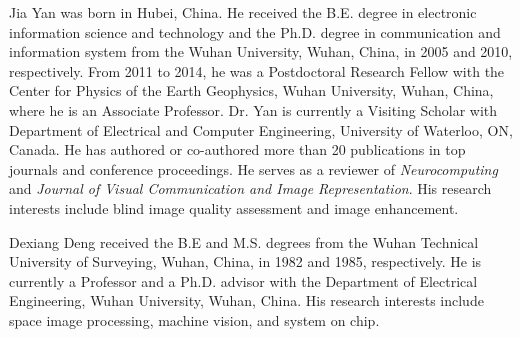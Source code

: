 \documentclass[journal]{IEEEtran}
\begin{document}
\begin{IEEEbiography}{Jia Yan}
was born in Hubei, China. He received the B.E. degree in electronic information science and technology and the Ph.D. degree in communication and information system from the Wuhan University, Wuhan, China, in 2005 and 2010, respectively.
From 2011 to  2014, he was a Postdoctoral Research Fellow with the Center for Physics of the Earth Geophysics, Wuhan University, Wuhan, China, where he is an Associate Professor. Dr. Yan is currently a Visiting Scholar with Department of Electrical and Computer Engineering, University of Waterloo, ON, Canada. He has authored or co-authored more than 20 publications in top journals and conference proceedings. He serves as a reviewer of {\em Neurocomputing} and {\em Journal of Visual Communication and Image Representation}. His research interests include blind image quality assessment and image enhancement.
\end{IEEEbiography}

\begin{IEEEbiography}{Dexiang Deng}
received the B.E and M.S. degrees from the Wuhan Technical University of Surveying, Wuhan, China, in 1982 and 1985, respectively. He is currently a Professor and a Ph.D. advisor with the Department of Electrical Engineering, Wuhan University, Wuhan, China. His research interests include space image processing, machine vision, and system on chip.
\end{IEEEbiography}
\end{document}

